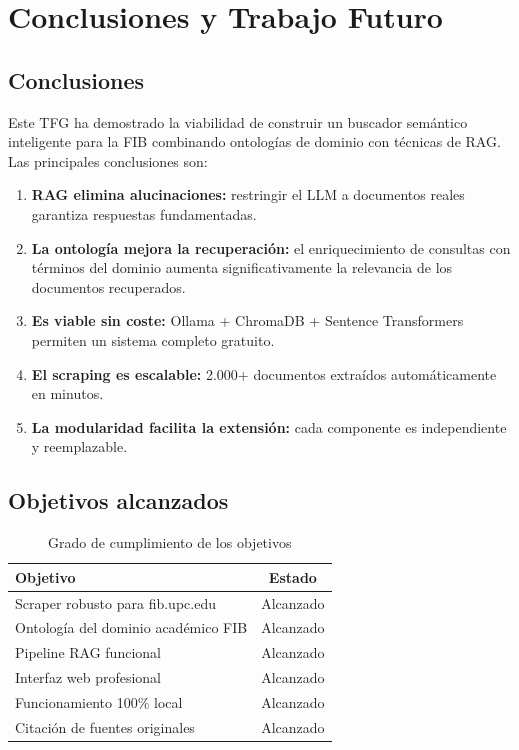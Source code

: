\documentclass[12pt, a4paper, twoside]{report}
\begin{document}
\chapter{Conclusiones y Trabajo Futuro}
\label{ch:conclusiones}

\section{Conclusiones}

Este TFG ha demostrado la viabilidad de construir un buscador sem\'antico inteligente para la FIB combinando ontolog\'ias de dominio con t\'ecnicas de RAG. Las principales conclusiones son:

\begin{enumerate}
  \item \textbf{RAG elimina alucinaciones:} restringir el LLM a documentos reales garantiza respuestas fundamentadas.
  \item \textbf{La ontolog\'ia mejora la recuperaci\'on:} el enriquecimiento de consultas con t\'erminos del dominio aumenta significativamente la relevancia de los documentos recuperados.
  \item \textbf{Es viable sin coste:} Ollama + ChromaDB + Sentence Transformers permiten un sistema completo gratuito.
  \item \textbf{El scraping es escalable:} 2.000+ documentos extra\'idos autom\'aticamente en minutos.
  \item \textbf{La modularidad facilita la extensi\'on:} cada componente es independiente y reemplazable.
\end{enumerate}

\section{Objetivos alcanzados}

\begin{table}[H]
\centering
\caption{Grado de cumplimiento de los objetivos}
\label{tab:objetivos}
\begin{tabularx}{\textwidth}{Xc}
\toprule
\textbf{Objetivo} & \textbf{Estado} \\
\midrule
Scraper robusto para fib.upc.edu & Alcanzado \\
Ontolog\'ia del dominio acad\'emico FIB & Alcanzado \\
Pipeline RAG funcional & Alcanzado \\
Interfaz web profesional & Alcanzado \\
Funcionamiento 100\% local & Alcanzado \\
Citaci\'on de fuentes originales & Alcanzado \\
\bottomrule
\end{tabularx}
\end{table}
\end{document}
